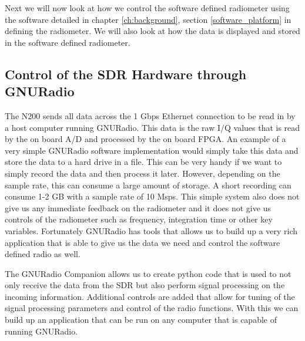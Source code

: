 

Next we will now look at how we control the software defined radiometer using the software detailed in chapter \ref{ch:background}, section \ref{software_platform} in defining the radiometer.  We will also look at how the data is displayed and stored in the software defined radiometer.

\subsection{Control of the SDR Hardware through GNURadio}
The N200 sends all data across the 1 Gbps Ethernet connection to be read in by a host computer running GNURadio.  This data is the raw I/Q values that is read by the on board A/D and processed by the on board FPGA.  An example of a very simple GNURadio software implementation would simply take this data and store the data to a hard drive in a file.  This can be very handy if we want to simply record the data and then process it later.  However, depending on the sample rate, this can consume a large amount of storage.  A short recording can  consume 1-2 GB with a sample rate of 10 Msps.  This simple system also does not give us any immediate feedback on the radiometer and it does not give us controls of the radiometer such as frequency, integration time or other key variables.  Fortunately GNURadio has tools that allows us to build up a very rich application that is able to give us the data we need and control the software defined radio as well.

The GNURadio Companion allows us to create python code that is used to not only receive the data from the SDR but also perform signal processing on the incoming information.  Additional controls are added that allow for tuning of the signal processing parameters and control of the radio functions.  With this we can build up an application that can be run on any computer that is capable of running GNURadio.  

